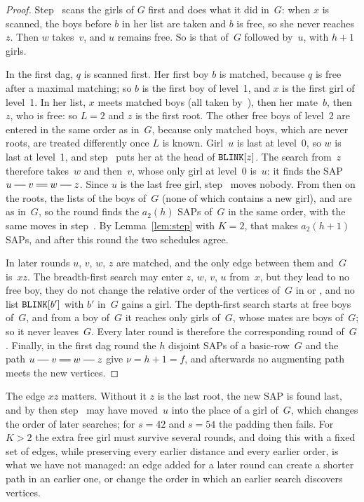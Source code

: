 \begin{proof}
Step~ scans the girls of $G$ first and does what it did in~$G$: when $x$
is scanned, the boys before $b$ in her list are taken and $b$ is free, so
she never reaches~$z$. Then $w$ takes~$v$, and $u$ remains free. So
 is that of~$G$ followed by~$u$, with $h+1$ girls.

In the first dag, $q$ is scanned first. Her first boy $b$ is matched,
because $q$ is free after a maximal matching; so $b$ is the first boy of
level~1, and $x$ is the first girl of level~1. In her list, $x$ meets
matched boys (all taken by~), then her mate~$b$, then $z$, who is free:
so $L=2$ and $z$ is the first root. The other free boys of level~2 are
entered in the same order as in~$G$, because only matched boys, which are
never roots, are treated differently once $L$ is known. Girl~$u$ is last at
level~0, so $w$ is last at level~1, and step~ puts her at the head of
$\texttt{BLINK}[z]$. The search from~$z$ therefore takes~$w$ and then~$v$, whose
only girl at level~0 is~$u$: it finds the SAP $u\sg v\db w\sg z$. Since $u$
is the last free girl, step~ moves nobody. From then on the roots,
the lists  of the boys of~$G$ (none of which contains a new girl),
and  are as in~$G$, so the round finds the $a_2(h)$ SAPs of~$G$ in
the same order, with the same moves in step~. By
Lemma~\ref{lem:step} with $K=2$, that makes $a_2(h+1)$ SAPs, and after this
round the two schedules agree.

In later rounds $u$, $v$, $w$, $z$ are matched, and the only edge between them
and~$G$ is~$xz$. The breadth-first search may enter $z$, $w$, $v$, $u$
from~$x$, but they lead to no free boy, they do not change the relative
order of the vertices of~$G$ in  or , and no list
$\texttt{BLINK}[b']$ with $b'$ in~$G$ gains a girl. The depth-first search starts
at free boys of~$G$, and from a boy of~$G$ it reaches only girls of~$G$,
whose mates are boys of~$G$; so it never leaves~$G$. Every later round is
therefore the corresponding round of~$G$. Finally, in the first dag round
the $h$ disjoint SAPs of a basic-row~$G$ and the path $u\sg v\db w\sg z$
give $\nu=h+1=f$, and afterwards no augmenting path meets the new vertices.
\end{proof}

The edge $xz$ matters. Without it $z$ is the last root, the new SAP is found
last, and by then step~ may have moved~$u$ into the place of a girl
of~$G$, which changes the order of later searches; for $s=42$ and $s=54$
the padding then fails. For $K>2$ the extra free girl must survive several
rounds, and doing this with a fixed set of edges, while preserving every
earlier distance and every earlier  order, is what we have not
managed: an edge added for a later round can create a shorter path in an
earlier one, or change the order in which an earlier search discovers
vertices.
